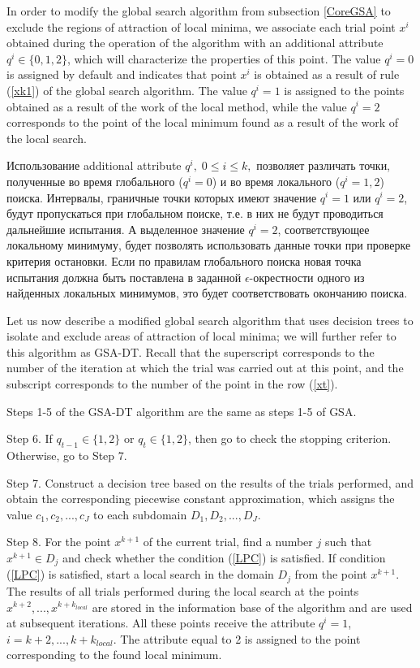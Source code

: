 \documentclass[entropy,article,submit,moreauthors,pdftex]{Definitions/mdpi}
\begin{document}
In order to modify the global search algorithm from subsection  \ref{CoreGSA} to exclude the regions of attraction of local minima, we associate each trial point  $x^i$ obtained during the operation of the algorithm with an additional attribute $q^i \in \{0,1,2\}$, which will characterize the properties of this point. 
The value  $q^i=0$ is assigned by default and indicates that point $x^i$ is obtained as a result of rule (\ref{xk1}) of the global search algorithm.
The value $q^i=1$ is assigned to the points obtained as a result of the work of the local method, while the value  $q^i=2$ corresponds to the point of the local minimum found as a result of the work of the local search.

Использование additional attribute $q^i, \; 0 \leq i \leq k ,$ позволяет различать точки, полученные во время глобального ($q^i=0$) и во время локального ($q^i=1,2$) поиска. Интервалы, граничные точки которых имеют значение $q^i=1$ или $q^i=2$, будут пропускаться при глобальном поиске, т.е. в них не будут проводиться дальнейшие испытания. 
А выделенное значение $q^i=2$, соответствующее локальному минимуму, будет позволять использовать данные точки при проверке критерия остановки. Если по правилам глобального поиска новая точка испытания должна быть поставлена в заданной $\epsilon$-окрестности одного из найденных локальных минимумов, это будет соответствовать окончанию поиска. 

Let us now describe a modified global search algorithm that uses decision trees to isolate and exclude areas of attraction of local minima; we will further refer to this algorithm as GSA-DT. Recall that the superscript corresponds to the number of the iteration at which the trial was carried out at this point, and the subscript corresponds to the number of the point in the row  (\ref{xt}).

Steps 1-5 of the GSA-DT algorithm are the same as steps 1-5 of GSA.

Step 6. If $q_{t-1} \in \{1,2\}$ or $q_t \in \{1,2\}$, then go to check the stopping criterion. Otherwise, go to Step 7.

Step 7. Construct a decision tree based on the results of the trials performed, and obtain the corresponding piecewise constant approximation, which assigns the value $c_1, c_2, ..., c_J$ to each subdomain  $D_1, D_2, ..., D_J$.

Step 8. For the point $x^{k+1}$ of the current trial, find a number $j$ such that $x^{k+1} \in D_j$ and check whether the condition  (\ref{LPC}) is satisfied. If condition (\ref{LPC}) is satisfied, start a local search in the domain $D_j$ from the point  $x^{k+1}$. 
The results of all trials performed during the local search at the points $x^{k+2}, ...,x^{k+k_{local}}$ are stored in the information base of the algorithm and are used at subsequent iterations. 
All these points receive the attribute  $q^i=1$, $i = k+2, ... , k+k_{local}$. The attribute equal to 2 is assigned to the point corresponding to the found local minimum.
\end{document}

